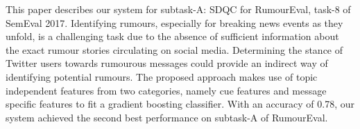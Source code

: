 This paper describes our system for subtask-A: SDQC for RumourEval, task-8 of SemEval 2017. Identifying rumours, especially for breaking news events as they unfold, is a challenging task due to the absence of sufficient information about the exact rumour stories circulating on social media. Determining the stance of Twitter users towards rumourous messages could provide an indirect way of identifying potential rumours. The proposed approach makes use of topic independent features from two categories, namely cue features and message specific features to fit a gradient boosting classifier. With an accuracy of 0.78, our system achieved the second best performance on subtask-A of RumourEval.
